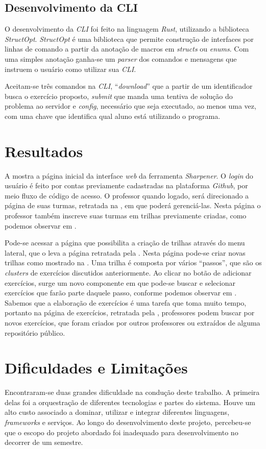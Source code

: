 \subsection{Desenvolvimento da CLI}
O desenvolvimento da \emph{CLI} foi feito na linguagem \emph{Rust}, utilizando 
a biblioteca \emph{StructOpt}. \emph{StructOpt} é uma biblioteca que permite construção 
de interfaces por linhas de comando a partir da anotação de macros em \emph{structs} ou 
\emph{enums}. Com uma simples anotação ganha-se um \emph{parser} dos comandos e mensagens 
que instruem o usuário como utilizar sua \emph{CLI}.
 
 Aceitam-se três comandos na \emph{CLI}, ``\emph{download}'' que a partir de um identificador busca 
 o exercício proposto, \emph{submit} que manda uma tentiva de solução do problema ao servidor e 
 \emph{config}, necessário que seja executado, ao menos uma vez, com uma chave que identifica 
 qual aluno está utilizando o programa.

\section{Resultados}
A  mostra a página inicial da interface \emph{web} da ferramenta \emph{Sharpener}.
O \emph{login} do usuário é feito por contas previamente cadastradas na plataforma \emph{Github},
por meio fluxo de código de acesso. O professor quando logado, será direcionado a página 
de suas turmas, retratada na , em que poderá gerenciá-las. Nesta página 
o professor também inscreve suas turmas em trilhas previamente criadas, como podemos 
observar em . 

Pode-se acessar a página que possibilita a criação de trilhas 
através do menu lateral, que o leva a página retratada pela . Nesta página 
pode-se criar novas trilhas como mostrado na . Uma trilha é composta por 
vários ``passos'', que são os \emph{clusters} de exercícios discutidos anteriormente. 
Ao clicar no botão de adicionar exercícios, surge um novo componente em que pode-se buscar 
e selecionar exercícios que farão parte daquele passo, conforme podemos observar em 
. Sabemos que a elaboração de exercícios é uma tarefa que toma 
muito tempo, portanto na página de exercícios, retratada pela ,
professores podem buscar por novos exercícios,  que foram criados por outros professores 
ou extraídos de alguma repositório público.


\section{Dificuldades e Limitações}
Encontraram-se duas grandes dificuldade na condução deste trabalho. 
A primeira delas foi a orquestração de diferentes tecnologias e partes do sistema. Houve um 
alto custo associado a dominar, utilizar e integrar diferentes linguagens, \emph{frameworks} 
e serviços. Ao longo do desenvolvimento deste projeto, percebeu-se que o escopo do projeto 
abordado foi inadequado para desenvolvimento no decorrer de um semestre.


